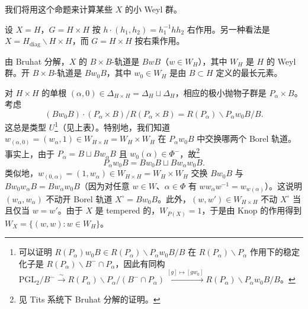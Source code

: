我们将用这个命题来计算某些 $X$ 的小 Weyl 群。

\begin{exmp}
[群情形]
设 $X=H$，$G=H\times H$ 按 $h\cdot(h_1,h_2)=h_1^{-1}hh_2$ 右作用。另一种看法是 $X=H_{\mathrm{diag}}\backslash H\times H$，而 $G=H\times H$ 按右乘作用。

由 Bruhat 分解，$X$ 的 $B\times B$-轨道是 $BwB$（$w\in W_H$），其中 $W_H$ 是 $H$ 的 Weyl 群。开 $B\times B$-轨道是 $Bw_0B$，其中 $w_0\in W_H$ 是由 $B\subset H$ 定义的最长元素。

对 $H\times H$ 的单根 $(\alpha,0)\in\Delta_{H\times H}=\Delta_H\sqcup\Delta_H$，相应的极小抛物子群是 $P_\alpha\times B$。考虑
\[
  (Bw_0B)\cdot(P_\alpha\times B)/R(P_\alpha\times B)=R(P_\alpha)\backslash P_\alpha w_0B/B.
\]
这总是类型 $U$\footnote{可以证明 $R(P_\alpha)w_0B\in R(P_\alpha)\backslash P_\alpha w_0B/B$ 在 $R(P_\alpha)\backslash P_\alpha$ 作用下的稳定化子是 $R(P_\alpha)\backslash B^-\cap P_\alpha$，因此有同构
  $\mathrm{PGL}_2/B^-\xrightarrow{\sim}R(P_\alpha)\backslash P_\alpha/(B^-\cap P_\alpha)\xrightarrow{[g]\mapsto[gw_0]}R(P_\alpha)\backslash P_\alpha w_0B/B$。}（见上表）。特别地，我们知道
$w_{(\alpha,0)}=(w_\alpha,1)\in W_{H\times H}=W_H\times W_H$ 在 $P_\alpha w_0B$ 中交换哪两个 Borel 轨道。事实上，由于 $P_\alpha=B\sqcup Bw_\alpha B$ 且 $w_0(\alpha)\in\Phi^-$，故\footnote{见 Tits 系统下 Bruhat 分解的证明。}
\[
  P_\alpha w_0B=Bw_0B\sqcup Bw_\alpha w_0B.
\]
类似地，$w_{(0,\alpha)}=(1,w_\alpha)\in W_{H\times H}=W_H\times W_H$ 交换 $Bw_0B$ 与 $Bw_0w_\alpha B=Bw_\alpha w_0B$（因为对任意 $w\in W$、$\alpha\in\Phi$ 有 $ww_\alpha w^{-1}=w_{w(\alpha)}$）。这说明 $(w_\alpha,w_\alpha)$ 不动开 Borel 轨道 $X^\circ=Bw_0B$。此外，$(w,w')\in W_{H\times H}$ 不动 $X^\circ$ 当且仅当 $w=w'$。由于 $X$ 是 tempered 的，$W_{P(X)}=1$，于是由 Knop 的作用得到 $W_X=\{(w,w):w\in W_H\}$。
\end{exmp}

